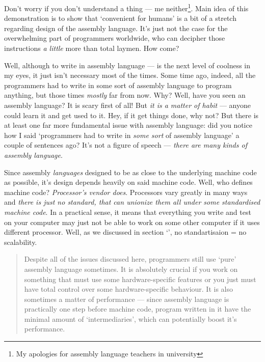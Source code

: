 \documentclass[../../why-computer.tex]{subfiles}
\begin{document}
        Don't worry if you don't understand a thing --- me neither\footnote{My apologies for assembly language teachers in university}. Main idea of this demonstration is to
        show that `convenient for humans' is a bit of a stretch regarding design of the assembly language. It's just not the case for the overwhelming part of programmers 
        worldwide, who can decipher those instructions \emph{a little} more than total laymen. How come? \par

        Well, although to write in assembly language --- is the next level of coolness in my eyes, it just isn't necessary most of the times. Some time ago, indeed, all the
        programmers had to write in some sort of assembly language to program anything, but those times \emph{mostly} far from now. Why? Well, have you seen an assembly language? It is 
        scary first of all! But \emph{it is a matter of habit} --- anyone could learn it and get used to it. Hey, if it get things done, why not? But there is at least one
        far more fundamental issue with assembly language: did you notice how I said `programmers had to write in \emph{some sort} of assembly language' a couple of sentences 
        ago? It's not a figure of speech --- \emph{there are many kinds of assembly language}. \par

        Since assembly \emph{languages} designed to be as close to the underlying machine code as possible, it's design depends heavily on said machine code. Well, who defines
        machine code? \emph{Processor's vendor does}. Processors vary greatly in many ways and \emph{there is just no standard, that can unionize them all under 
        some standardised machine code}. In a practical sense, it means that everything you write and test on your computer may just not be able to work on some other computer
        if it uses different processor. Well, as we discussed in section `', no standartisaion = no scalability. \par
        
        \begin{quote}
                Despite all of the issues discussed here, programmers still use `pure' assembly language sometimes. It is absolutely crucial if you work on something
                that must use some hardware-specific features or you just must have total control over some hardware-specific behaviour.
                It is also sometimes a matter of performance --- since assembly language is practically one step before machine code, program
                written in it have the minimal amount of `intermediaries', which can potentially boost it's performance.
        \end{quote}
\end{document}
